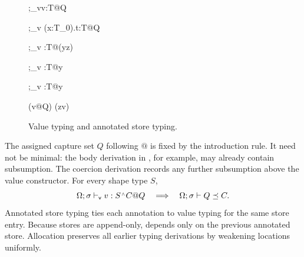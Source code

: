 \documentclass[acmsmall,screen,nonacm]{acmart}
\begin{document}
\begin{figure}[H]
 {\Omega;\sigma\vdash_{\mathsf v}v:T@Q}
\noindent
\begin{minipage}[t]{0.47\linewidth}
  {\Omega;\sigma\vdash_{\mathsf v}
     \lambda(x:T_0).t:T@Q}

  {\Omega;\sigma\vdash_{\mathsf v}
     :T@(\set y\cup\set z)}
\end{minipage}\hfill
\begin{minipage}[t]{0.51\linewidth}
  {\Omega;\sigma\vdash_{\mathsf v}
     :T@\set y}

  {\Omega;\sigma\vdash_{\mathsf v}
     :T@\set y}
\end{minipage}

\noindent
\begin{minipage}[t]{0.26\linewidth}
\end{minipage}\hfill
\begin{minipage}[t]{0.68\linewidth}
  {\Omega\mathbin{\cdot}(v@Q)\valid
   \sigma\mathbin{\cdot}(z\mapsto v)}
\end{minipage}

\caption{Value typing and annotated store typing.}
\label{fig:value-store-typing}
\end{figure}

\endgroup

The assigned capture set \(Q\) following \(@\) is fixed by the introduction
rule. It need not be minimal: the body derivation in , for
example, may already contain subsumption. The coercion derivation records any further subsumption above
the value constructor. For every shape type \(S\),
\[
  \Omega;\sigma\vdash_{\mathsf v}v:S\capt C@Q
  \quad\Longrightarrow\quad
  \Omega;\sigma\vdash Q\semleq C.
\]
Annotated store typing ties each annotation to value typing for the same store entry.
Because stores are append-only,  depends only on the
previous annotated store. Allocation preserves all earlier typing derivations by
weakening locations uniformly.
\end{document}
